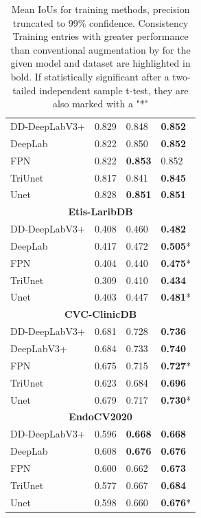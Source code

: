 \begin{table}[htb]
\begin{tabularx}{\linewidth}{llXX}
        DD-DeepLabV3+& 0.829 & 0.848 & \textbf{0.852} \\
        DeepLab& 0.822 & 0.850 & \textbf{0.852} \\
        FPN& 0.822 & \textbf{0.853} & 0.852 \\
        TriUnet& 0.817 & 0.841 & \textbf{0.845} \\
        Unet& 0.828 & \textbf{0.851} & \textbf{0.851} \\
\midrule
\multicolumn{4}{c}{\textbf{Etis-LaribDB}}\\
\midrule
        DD-DeepLabV3+& 0.408 & 0.460 & \textbf{0.482 }\\
        DeepLab& 0.417 & 0.472 & \textbf{0.505}* \\
        FPN& 0.404 & 0.440 & \textbf{0.475}* \\
        TriUnet& 0.309 & 0.410 & \textbf{0.434} \\
        Unet& 0.403 & 0.447 & \textbf{0.481}* \\
\midrule
\multicolumn{4}{c}{\textbf{CVC-ClinicDB}}\\
\midrule
        DD-DeepLabV3+ & 0.681 & 0.728 & \textbf{0.736} \\
        DeepLabV3+& 0.684 & 0.733 & \textbf{0.740} \\
        FPN& 0.675 & 0.715 & \textbf{0.727}* \\
        TriUnet& 0.623 & 0.684 & \textbf{0.696} \\
        Unet& 0.679 & 0.717 & \textbf{0.730}* \\
\midrule
\multicolumn{4}{c}{\textbf{EndoCV2020}}\\
\midrule
        DD-DeepLabV3+& 0.596 & \textbf{0.668} & \textbf{0.668} \\
        DeepLab& 0.608 & \textbf{0.676} & \textbf{0.676} \\
        FPN& 0.600 & 0.662 & \textbf{0.673 }\\
        TriUnet& 0.577 & 0.667 & \textbf{0.684} \\
        Unet& 0.598 & 0.660 & \textbf{0.676}*\\
\bottomrule
    \end{tabularx}
    \caption[Mean IoUs for training methods]{Mean IoUs for training methods, precision truncated to 99\% confidence. Consistency Training entries with greater performance than conventional augmentation by for the given model and dataset are highlighted in bold. If statistically significant after a two-tailed independent sample t-test, they are also marked with a "*"}
    \label{tab:consistency}
\end{table}

